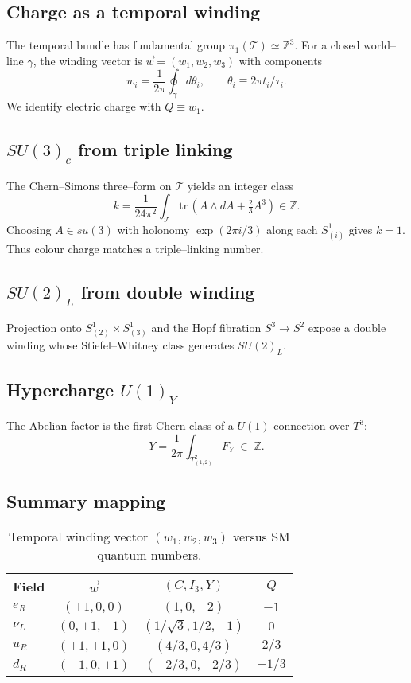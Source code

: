 \documentclass[aps,prd,reprint,amsmath,amssymb,nofootinbib]{revtex4-2}
\begin{document}
\subsection{Charge as a temporal winding}
The temporal bundle has fundamental group $\pi_1(\mathcal{T})\simeq \mathbb{Z}^3$.  For a closed world--line $\gamma$, the winding vector is $\vec w=(w_1,w_2,w_3)$ with components
\begin{equation}
  w_i=\frac{1}{2\pi}\oint_{\gamma} d\theta_i,\qquad \theta_i\equiv 2\pi t_i/\tau_i.
\end{equation}
We identify electric charge with $Q\equiv w_1$.

\subsection{$SU(3)_c$ from triple linking}
The Chern--Simons three--form on $\mathcal{T}$ yields an integer class
\begin{equation}
  k=\frac{1}{24\pi^2}\int_{\mathcal{T}}\text{tr}\,(A\wedge dA+\tfrac23A^3)\in\mathbb{Z}.
  \label{eq:CS}
\end{equation}
Choosing $A\in su(3)$ with holonomy $\exp(2\pi i/3)$ along each $S^1_{(i)}$ gives $k=1$.  Thus colour charge matches a triple--linking number.

\subsection{$SU(2)_L$ from double winding}
Projection onto $S^1_{(2)}\times S^1_{(3)}$ and the Hopf fibration $S^3\to S^2$ expose a double winding whose Stiefel--Whitney class generates $SU(2)_L$.

\subsection{Hypercharge $U(1)_Y$}
The Abelian factor is the first Chern class of a $U(1)$ connection over $T^3$:
\begin{equation}
  Y=\frac{1}{2\pi}\int_{T^2_{(1,2)}}F_Y\;\in\;\mathbb{Z}.
\end{equation}

\subsection{Summary mapping}
\begin{table}[h]
  \caption{Temporal winding vector $(w_1,w_2,w_3)$ versus SM quantum numbers.}
  \begin{ruledtabular}
    \begin{tabular}{lccc}
    Field & $\vec w$ & $(C,I_3,Y)$ & $Q$ \\ \hline
    $e_R$ & $(+1,0,0)$ & $(1,0,-2)$ & $-1$ \\
    $\nu_L$ & $(0,+1,-1)$ & $(1/\sqrt3,1/2,-1)$ & $0$ \\
    $u_R$ & $(+1,+1,0)$ & $(4/3,0,4/3)$ & $2/3$ \\
    $d_R$ & $(-1,0,+1)$ & $(-2/3,0,-2/3)$ & $-1/3$ \\
    \end{tabular}
  \end{ruledtabular}
  \label{tab:windingMap}
\end{table}
\end{document}
